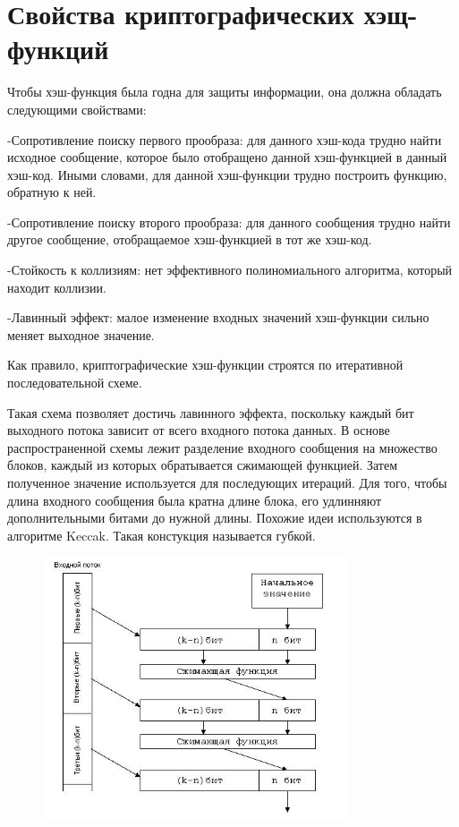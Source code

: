 \documentclass[a4paper,12pt]{article}
\theoremstyle{plain} %
\theoremstyle{definition} %
\theoremstyle{remark} %
\begin{document}
	\section{Свойства криптографических хэщ-функций}
	
	Чтобы хэш-функция была годна для защиты информации, она должна обладать следующими свойствами:
	
	-Сопротивление поиску первого прообраза: для данного хэш-кода трудно найти исходное сообщение, которое было отобращено данной хэш-функцией в данный хэш-код. Иными словами, для данной хэш-функции трудно построить функцию, обратную к ней.
	
	-Сопротивление поиску второго прообраза: для данного сообщения трудно найти другое сообщение, отобращаемое хэш-функцией в тот же хэш-код. 
	
	-Стойкость к коллизиям: нет эффективного полиномиального алгоритма, который находит коллизии.
	
	-Лавинный эффект: малое изменение входных значений хэш-функции сильно меняет выходное значение.
	
	Как правило, криптографические хэш-функции строятся по итеративной последовательной схеме. 
	
	Такая схема позволяет достичь лавинного эффекта, поскольку каждый бит выходного потока зависит от всего входного потока данных. В основе распространенной схемы лежит разделение входного сообщения на множество блоков, каждый из которых обратывается сжимающей функцией. Затем полученное значение используется для последующих итераций. Для того, чтобы длина входного сообщения была кратна длине блока, его удлинняют дополнительными битами до нужной длины. Похожие идеи используются в алгоритме Keccak. Такая констукция называется губкой.
	
	\newpage
	
	\begin{figure}[h!]
		\centering
		\includegraphics[width=90mm]{1.jpg}
	\end{figure}
	
\end{document}
